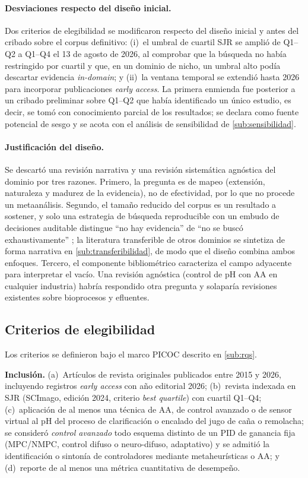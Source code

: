 \paragraph{Desviaciones respecto del diseño inicial.} Dos criterios de
elegibilidad se modificaron respecto del diseño inicial y antes del
cribado sobre el corpus definitivo: (i)~el umbral de cuartil SJR se amplió de
Q1--Q2 a Q1--Q4 el 13 de agosto de 2026, al comprobar que la búsqueda no
había restringido por cuartil y que, en un dominio de nicho, un umbral
alto podía descartar evidencia \textit{in-domain}; y (ii)~la ventana
temporal se extendió hasta 2026 para incorporar publicaciones
\textit{early access}. La primera enmienda fue posterior a un cribado
preliminar sobre Q1--Q2 que había identificado un único estudio, es
decir, se tomó con conocimiento parcial de los resultados; se declara
como fuente potencial de sesgo y se acota con el análisis de
sensibilidad de \ref{sub:sensibilidad}.

\paragraph{Justificación del diseño.} Se descartó una revisión narrativa
y una revisión sistemática agnóstica del dominio por tres razones.
Primero, la pregunta es de mapeo (extensión, naturaleza y madurez de la
evidencia), no de efectividad, por lo que no procede un metaanálisis.
Segundo, el tamaño reducido del corpus es un resultado a sostener, y solo
una estrategia de búsqueda reproducible con un embudo de decisiones
auditable distingue ``no hay evidencia'' de ``no se buscó
exhaustivamente'' \parencite{lang2007empty,yaffe2012empty}; la
literatura transferible de otros dominios se sintetiza de forma
narrativa en \ref{sub:transferibilidad}, de modo que el diseño combina
ambos enfoques. Tercero, el componente bibliométrico caracteriza el campo
adyacente para interpretar el vacío. Una revisión agnóstica (control de
pH con AA en cualquier industria) habría respondido otra pregunta y
solaparía revisiones existentes sobre bioprocesos y efluentes.

\subsection{Criterios de elegibilidad}
\label{sub:criterios}

Los criterios se definieron bajo el marco PICOC descrito en
\ref{sub:rqs}.

\noindent\textbf{Inclusión.}
(a)~Artículos de revista originales publicados entre 2015 y 2026,
incluyendo registros \textit{early access} con año editorial 2026;
(b)~revista indexada en SJR (SCImago, edición 2024, criterio
\textit{best quartile}) con cuartil Q1--Q4;
(c)~aplicación de al menos una técnica de AA, de control avanzado o de
sensor virtual al pH del proceso de clarificación o encalado del jugo de
caña o remolacha; se consideró \emph{control avanzado} todo esquema
distinto de un PID de ganancia fija (MPC/NMPC, control difuso o
neuro-difuso, adaptativo) y se admitió la identificación o sintonía de
controladores mediante metaheurísticas o AA; y
(d)~reporte de al menos una métrica cuantitativa de desempeño.

